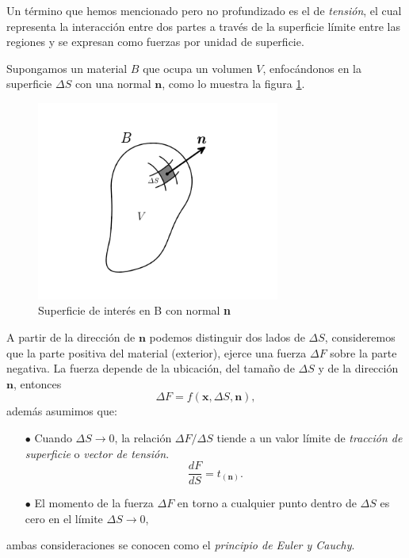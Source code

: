 \documentclass[a4paper,10pt, oneside]{book}
\begin{document}
Un término que hemos mencionado pero no profundizado es el de \textit{tensión}, el cual representa la interacción entre dos partes a través de la superficie límite entre las regiones y se expresan como fuerzas por unidad de superficie.

Supongamos un material $B$ que ocupa un volumen $V$, enfocándonos en la superficie $\Delta S$ con una normal $\mathbf{n}$, como lo muestra la figura \ref{img:1-3}.
\begin{figure}[h!]
    \centering
    \includegraphics[width=8cm]{Img/1-3}
	\caption{Superficie de interés en B con normal \textbf{n}}      
    \label{img:1-3}
\end{figure}

A partir de la dirección de $\mathbf{n}$ podemos distinguir dos lados de $\Delta S$, consideremos que la parte positiva del material (exterior), ejerce una fuerza $\Delta F$ sobre la parte negativa. La fuerza depende de la ubicación, del tamaño de $\Delta S$ y de la dirección $\mathbf{n}$, entonces
\begin{equation}
	\Delta F = f (\mathbf{x},\Delta S, \mathbf{n}), \nonumber
\end{equation}
además asumimos que:
\begin{itemize}
	\item[$\bullet$] Cuando $\Delta S \rightarrow 0$, la relación $\Delta F / \Delta S$ tiende a un valor límite de \textit{tracción de superficie} o \textit{vector de tensión}.
	\begin{equation}
		\frac{dF}{dS}  = t_{(\mathbf{n})}. \nonumber
	\end{equation}
	\item[$\bullet$] El momento de la fuerza $\Delta F$ en torno a cualquier punto dentro de $\Delta S$ es cero en el límite $\Delta S \rightarrow 0$,
\end{itemize}
ambas consideraciones se conocen como el \textit{principio de Euler y Cauchy}.
\end{document}
